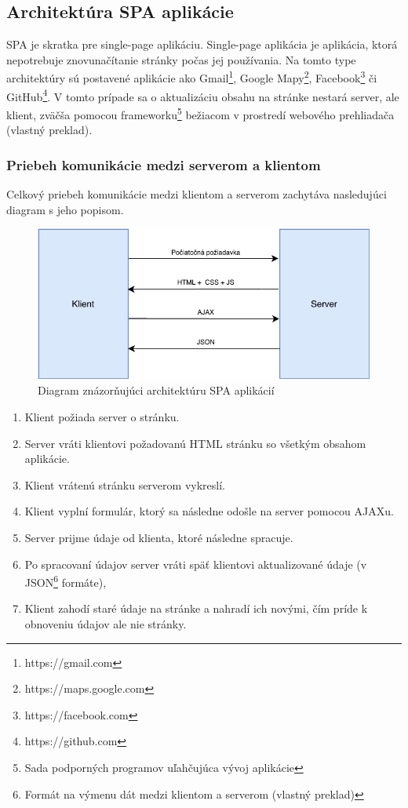 \subsection{Architektúra SPA aplikácie}
SPA je skratka pre single-page aplikáciu. Single-page aplikácia je aplikácia, ktorá nepotrebuje znovunačítanie stránky počas jej používania. Na tomto type architektúry sú postavené aplikácie ako Gmail\footnote{https://gmail.com}, Google Mapy\footnote{https://maps.google.com}, Facebook\footnote{https://facebook.com} či GitHub\footnote{https://github.com}. V tomto prípade sa o aktualizáciu obsahu na stránke nestará server, ale klient, zväčša pomocou frameworku\footnote{Sada podporných programov uľahčujúca vývoj aplikácie} bežiacom v prostredí webového prehliadača \cite{spa-vs-mpa-3} (vlastný preklad).

\subsubsection*{Priebeh komunikácie medzi serverom a klientom}
Celkový priebeh komunikácie medzi klientom a serverom zachytáva nasledujúci diagram s jeho popisom.

\begin{figure}[H]
	\includegraphics[width=1.0\textwidth]{media/navrh/SPA.pdf}
	\caption{Diagram znázorňujúci architektúru SPA aplikácií}\label{spa-graf}
\end{figure}

\begin{enumerate}
	\item Klient požiada server o stránku.
	\item Server vráti klientovi požadovanú HTML stránku so všetkým obsahom aplikácie.
	\item Klient vrátenú stránku serverom vykreslí.
	\item Klient vyplní formulár, ktorý sa následne odošle na server pomocou AJAXu.
	\item Server prijme údaje od klienta, ktoré následne spracuje.
	\item Po spracovaní údajov server vráti späť klientovi aktualizované údaje (v JSON\footnote{Formát na výmenu dát medzi klientom a serverom \cite{co-je-json} (vlastný preklad)} formáte),
	\item Klient zahodí staré údaje na stránke a nahradí ich novými, čím príde k obnoveniu údajov ale nie stránky.
\end{enumerate}


